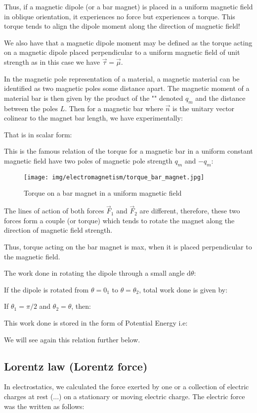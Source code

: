 	Thus, if a magnetic dipole (or a bar magnet) is placed in a uniform magnetic field in oblique orientation, it experiences no force but experiences a torque. This torque tends to align the dipole moment along the direction of magnetic field!
	
	We also have that a magnetic dipole moment may be defined as the torque acting on a magnetic dipole placed perpendicular to a uniform magnetic field of unit strength as in this case we have $\vec{\tau}=\vec{\mu}$.

	In the magnetic pole representation of a material, a magnetic material can be identified as two magnetic poles some distance apart. The magnetic moment of a material bar is then given by the product of the "" denoted $q_m$ and the distance between the poles $L$. Then for a magnetic bar where $\vec{n}$ is the unitary vector colinear to the magnet bar length, we have experimentally:
	
	That is in scalar form:
	
	This is the famous relation of the torque for a magnetic bar in a uniform constant magnetic field have two poles of magnetic pole strength $q_m$ and $-q_m$:
	\begin{figure}[H]
		\centering
		\texttt{[image: img/electromagnetism/torque\_bar\_magnet.jpg]}
		\caption{Torque on a bar magnet in a uniform magnetic field}
	\end{figure}
	The lines of action of both forces $\vec{F}_1$ and $\vec{F}_2$ are different, therefore, these two forces form a couple (or torque) which tends to rotate the magnet along the direction of magnetic field strength. 
	
	Thus, torque acting on the bar magnet is max, when it is placed perpendicular to the magnetic field.

	The work done in rotating the dipole through a small angle $\mathrm{d}\theta$:
	
	If the dipole is rotated from $\theta=0_1$ to $\theta=\theta_2$, total work done is given by:
	
	If $\theta_1=\pi/2$ and $\theta_2=\theta$, then:
	
	This work done is stored in the form of Potential Energy i.e:
	
	We will see again this relation further below.
	
	\pagebreak
	\subsection{Lorentz law (Lorentz force)}
	In electrostatics, we calculated the force exerted by one or a collection of electric charges at rest (...) on a stationary or moving electric charge. The electric force was the written as follows:
	
